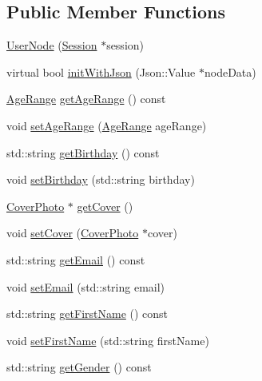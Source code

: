 \subsection*{Public Member Functions}
\begin{DoxyCompactItemize}
\item 
\hyperlink{classfl4cpp_1_1_user_node_a22fbf9d8b4226d4cf09f4a7bd0d8d700}{User\+Node} (\hyperlink{classfl4cpp_1_1_session}{Session} $\ast$session)
\item 
virtual bool \hyperlink{classfl4cpp_1_1_user_node_aceffa0d69285709d123b72b3e980e586}{init\+With\+Json} (Json\+::\+Value $\ast$node\+Data)
\item 
\hyperlink{classfl4cpp_1_1_age_range}{Age\+Range} \hyperlink{classfl4cpp_1_1_user_node_a9913c4830237905447b682da96a41174}{get\+Age\+Range} () const 
\item 
void \hyperlink{classfl4cpp_1_1_user_node_a142fbfbfb0a07f26d21af1440352589f}{set\+Age\+Range} (\hyperlink{classfl4cpp_1_1_age_range}{Age\+Range} age\+Range)
\item 
std\+::string \hyperlink{classfl4cpp_1_1_user_node_a0e758e869a92f81b260bf475d68c12b0}{get\+Birthday} () const 
\item 
void \hyperlink{classfl4cpp_1_1_user_node_af5ff6caf8d56c5ddedfee40a19fbc951}{set\+Birthday} (std\+::string birthday)
\item 
\hyperlink{classfl4cpp_1_1_cover_photo}{Cover\+Photo} $\ast$ \hyperlink{classfl4cpp_1_1_user_node_ad49e08210675018ec9bf864960b8fbb9}{get\+Cover} ()
\item 
void \hyperlink{classfl4cpp_1_1_user_node_a091c31d41146703f19b1f39b1eca71d3}{set\+Cover} (\hyperlink{classfl4cpp_1_1_cover_photo}{Cover\+Photo} $\ast$cover)
\item 
std\+::string \hyperlink{classfl4cpp_1_1_user_node_af84156248e4b75ebc07453c2f84491ae}{get\+Email} () const 
\item 
void \hyperlink{classfl4cpp_1_1_user_node_abe3e5c4d00c5a66678aa8f492674be60}{set\+Email} (std\+::string email)
\item 
std\+::string \hyperlink{classfl4cpp_1_1_user_node_ae30dc1f46a3775da028bdaf202aca0d4}{get\+First\+Name} () const 
\item 
void \hyperlink{classfl4cpp_1_1_user_node_a0bbadc8664635e32def781047df4b719}{set\+First\+Name} (std\+::string first\+Name)
\item 
std\+::string \hyperlink{classfl4cpp_1_1_user_node_ad47921fdc389f35c3162484a46850d08}{get\+Gender} () const 
\item 

\end{DoxyCompactItemize}
